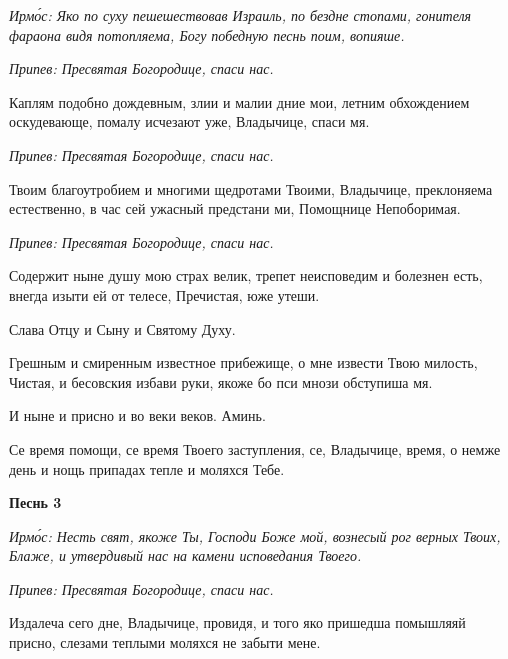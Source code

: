  \itshape Ирмо́с:\normalfont{} Яко по суху пешешествовав Израиль, по бездне стопами, гонителя
фараона видя потопляема, Богу победную песнь поим, вопияше.



 \itshape Припев:\normalfont{} Пресвятая Богородице, спаси нас.



   Каплям подобно дождевным, злии и малии дние мои, летним
обхождением оскудевающе, помалу исчезают уже, Владычице, спаси
мя.



 \itshape Припев:\normalfont{} Пресвятая Богородице, спаси нас.



   Твоим благоутробием и многими щедротами Твоими, Владычице,
преклоняема естественно, в час сей ужасный предстани ми, Помощнице
Непоборимая.



 \itshape Припев:\normalfont{} Пресвятая Богородице, спаси нас.



   Содержит ныне душу мою страх велик, трепет неисповедим и болезнен
есть, внегда изыти ей от телесе, Пречистая, юже утеши.



   Слава Отцу и Сыну и Святому Духу.



   Грешным и смиренным известное прибежище, о мне извести Твою
милость, Чистая, и бесовския избави руки, якоже бо пси мнози обступиша
мя.



   И ныне и присно и во веки веков. Аминь.



   Се время помощи, се время Твоего заступления, се, Владычице, время, о
немже день и нощь припадах тепле и моляхся Тебе.



 

\bfseries Песнь 3\normalfont{}


 \itshape Ирмо́с:\normalfont{} Несть свят, якоже Ты, Господи Боже мой, вознесый рог верных Твоих,
Блаже, и утвердивый нас на камени исповедания Твоего.



 \itshape Припев:\normalfont{} Пресвятая Богородице, спаси нас.



   Издалеча сего дне, Владычице, провидя, и того яко пришедша
помышляяй присно, слезами теплыми моляхся не забыти мене.



